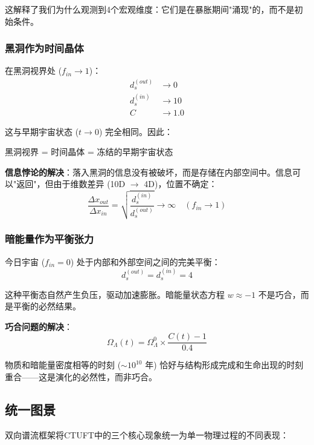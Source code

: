 这解释了我们为什么观测到4个宏观维度：它们是在暴胀期间"涌现"的，而不是初始条件。

\subsubsection{黑洞作为时间晶体}

在黑洞视界处 ($f_{in} \to 1$)：
\begin{align}
d_s^{(out)} &\to 0 \\
d_s^{(in)} &\to 10 \\
C &\to 1.0
\end{align}

这与早期宇宙状态 ($t \to 0$) 完全相同。因此：
\begin{insight}
黑洞视界 = 时间晶体 = 冻结的早期宇宙状态
\end{insight}

\textbf{信息悖论的解决}：落入黑洞的信息没有被破坏，而是存储在内部空间中。信息可以"返回"，但由于维数差异 (10D $\to$ 4D)，位置不确定：
\begin{equation}
\frac{\Delta x_{out}}{\Delta x_{in}} = \sqrt{\frac{d_s^{(in)}}{d_s^{(out)}}} \to \infty \quad (f_{in} \to 1)
\end{equation}

\subsubsection{暗能量作为平衡张力}

今日宇宙 ($f_{in} = 0$) 处于内部和外部空间之间的完美平衡：
\begin{equation}
d_s^{(out)} = d_s^{(in)} = 4
\end{equation}

这种平衡态自然产生负压，驱动加速膨胀。暗能量状态方程 $w \approx -1$ 不是巧合，而是平衡的必然结果。

\textbf{巧合问题的解决}：
\begin{equation}
\Omega_\Lambda(t) = \Omega_\Lambda^0 \times \frac{C(t) - 1}{0.4}
\end{equation}

物质和暗能量密度相等的时刻 ($\sim 10^{10}$ 年) 恰好与结构形成完成和生命出现的时刻重合——这是演化的必然性，而非巧合。

\subsection{统一图景}

双向谱流框架将CTUFT中的三个核心现象统一为单一物理过程的不同表现：

